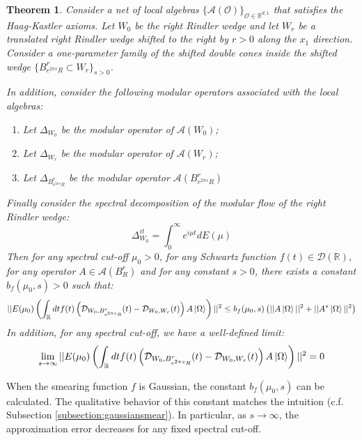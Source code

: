 \documentclass[a4paper,11pt]{article}
\newtheorem{theorem}{Theorem}
\theoremstyle{definition}
\newcommand{\lb}{\left(}
\newcommand{\rb}{\right)}
\begin{document}
\begin{theorem}\label{theorem:mainresult}
    Consider a net of local algebras $\{\mathcal{A}(\mathcal{O})\}_{\mathcal{O}\in\mathbb{R}^{d,1}}$ that satisfies the Haag-Kastler axioms. Let $W_0$ be the right Rindler wedge and let $W_r$ be a translated right Rindler wedge shifted to the right by $r > 0$ along the $x_1$ direction. Consider a one-parameter family of the shifted double cones inside the shifted wedge $\{B^r_{e^{2\pi s}R} \subset W_r\}_{s > 0}$. 
    
    In addition, consider the following modular operators associated with the local algebras:
    \begin{enumerate}
        \item Let $\Delta_{W_0}$ be the modular operator of $\mathcal{A}(W_0)$;
        \item Let $\Delta_{W_r}$ be the modular operator of $\mathcal{A}(W_r)$;
        \item Let $\Delta_{B^r_{e^{2\pi s}R}}$ be the modular operator $\mathcal{A}(B^r_{e^{2\pi s}R})$
    \end{enumerate}
    Finally consider the spectral decomposition of the modular flow of the right Rindler wedge:
    \begin{equation}
        \Delta_{W_0}^{it} = \int_0^\infty e^{i\mu t} dE(\mu)
    \end{equation}
    Then for any spectral cut-off $\mu_0 > 0$, for any Schwartz function $f(t)\in \mathcal{D}(\mathbb{R})$, for any operator $A\in \mathcal{A}(B^r_R)$ and for any constant $s > 0$, there exists a constant $b_f(\mu_0, s) > 0$ such that:
    \begin{equation}
        ||E(\mu_0)\lb\int_\mathbb{R} dtf(t)\lb\mathcal{D}_{W_0, B^r_{e^{2\pi s}R}}(t) - \mathcal{D}_{W_0, W_r}(t)\rb A\ket{\Omega}\rb||^2 \leq b_f(\mu_0, s)\lb||A\ket{\Omega}||^2 + ||A^*\ket{\Omega}||^2\rb
    \end{equation}
    In addition, for any spectral cut-off, we have a well-defined limit:
    \begin{equation}
        \lim_{s\rightarrow \infty}||E(\mu_0)\lb\int_\mathbb{R} dt f(t)\lb\mathcal{D}_{W_0, B^r_{e^{2\pi s}R}}(t) - \mathcal{D}_{W_0, W_r}(t)\rb A\ket{\Omega}\rb||^2 = 0
    \end{equation}
\end{theorem}
When the smearing function $f$ is Gaussian, the constant $b_f(\mu_0, s)$ can be calculated. The qualitative behavior of this constant matches the intuition (c.f. Subsection \ref{subsection:gaussiansmear}). In particular, as $s\rightarrow\infty$, the approximation error decreases for any fixed spectral cut-off. 
\end{document}
